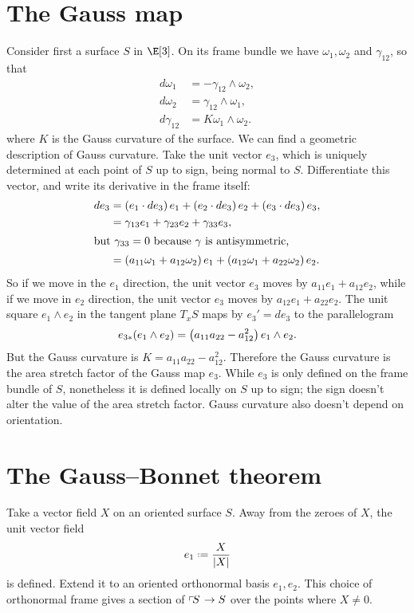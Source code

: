 \section{The Gauss map}
Consider first a surface \(S\) in \(\E[3]\).
On its frame bundle we have \(\omega_1, \omega_2\) and \(\gamma_{12}\), so that
\begin{align*}
 d\omega_1 &= - \gamma_{12} \wedge \omega_2, \\
 d\omega_2 &= \gamma_{12} \wedge \omega_1, \\
 d\gamma_{12} &= K \omega_1 \wedge \omega_2.
\end{align*}
where \(K\) is the Gauss curvature of the surface.
We can find a geometric description of Gauss curvature.
Take the unit vector \(e_3\), which is uniquely determined at each point of \(S\) up to sign, being normal to \(S\).
Differentiate this vector, and write its derivative in the frame itself:
\begin{align*}
 de_3 &= \left(e_1 \cdot de_3\right) e_1 + \left(e_2 \cdot de_3\right)e_2 + \left(e_3 \cdot de_3\right) e_3, \\
      &= \gamma_{13} e_1 + \gamma_{23} e_2 + \gamma_{33} e_3, \\
      \intertext{but \(\gamma_{33}=0\) because \(\gamma\) is antisymmetric,}
      &= \left(a_{11} \omega_1 + a_{12} \omega_2\right)e_1+\left(a_{12} \omega_1 + a_{22} \omega_2\right)e_2.
\end{align*}
So if we move in the \(e_1\) direction, the unit vector \(e_3\) moves by \(a_{11}e_1+a_{12}e_2\), while if we move in \(e_2\) direction, the unit vector \(e_3\) moves by \(a_{12}e_1+a_{22}e_2\).
The unit square \(e_1 \wedge e_2\) in the tangent plane \(T_x S\) maps by \(e_3'=de_3\) to the parallelogram
\[
 e_{3*} (e_1 \wedge e_2) = \left(a_{11} a_{22} - a_{12}^2\right) e_1 \wedge e_2.
\]
But the Gauss curvature is \(K = a_{11} a_{22} - a_{12}^2\).
Therefore the Gauss curvature is the area stretch factor of the Gauss map \(e_3\).
While \(e_3\) is only defined on the frame bundle of \(S\), nonetheless it is defined locally on \(S\) up to sign; the sign doesn't alter the value of the area stretch factor.
Gauss curvature also doesn't depend on orientation.

\section{The Gauss--Bonnet theorem}\label{section:Gauss.Bonnet.moving.frame}
Take a vector field \(X\) on an oriented surface \(S\).
Away from the zeroes of \(X\), the unit vector field 
\[
e_1\defeq\frac{X}{\norm{X}}
\]
is defined.
Extend it to an oriented orthonormal basis \(e_1, e_2\).
This choice of orthonormal frame gives a section of \(\left\ulcorner\!S\right. \to S\) over the points where \(X \ne 0\).

